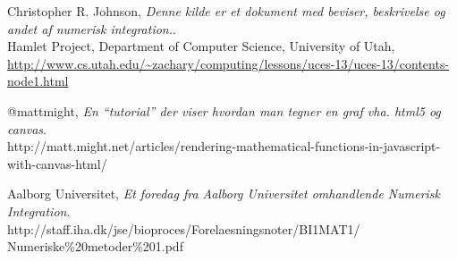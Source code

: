 \documentclass[12pt]{article}
\numberwithin{equation}{section}
\begin{document}
\clearpage
{}
\begin{thebibliography}{9}

  	Christopher R. Johnson,
  	\emph{Denne kilde er et dokument med beviser, beskrivelse og andet af numerisk integration.}.\\
  	Hamlet Project, 
  	Department of Computer Science,
	University of Utah,
	\url{http://www.cs.utah.edu/~zachary/computing/lessons/uces-13/uces-13/contents-node1.html}
	
	@mattmight,
	\emph{En ``tutorial'' der viser hvordan man tegner en graf vha. html5 og canvas}.\\
	http://matt.might.net/articles/rendering-mathematical-functions-in-javascript-with-canvas-html/

	Aalborg Universitet,
	\emph{Et foredag fra Aalborg Universitet omhandlende Numerisk Integration}.\\
	http://staff.iha.dk/jse/bioproces/Forelaesningsnoter/BI1MAT1/\\Numeriske\%20metoder\%201.pdf

\end{thebibliography}
\end{document}
